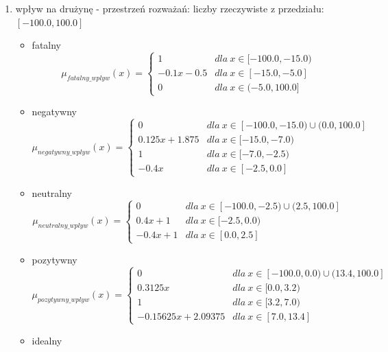 \documentclass{classrep}
\begin{document}
\begin{enumerate}
    \item wpływ na drużynę - przestrzeń rozważań: liczby rzeczywiste z przedziału:  $[-100.0, 100.0]$
    \begin{itemize}
        \item fatalny
        \begin{equation}
            \mu_{fatalny\_wplyw}(x) = \left\{\begin{matrix} 1 & dla \: x\in[-100.0, -15.0) \\ -0.1x - 0.5 & dla \: x\in [-15.0, -5.0] \\ 0 & dla \: x\in (-5.0, 100.0] \end{matrix}\right.
        \end{equation}
         \item negatywny
        \begin{equation}
            \mu_{negatywny\_wplyw}(x) = \left\{\begin{matrix} 0 & dla \: x\in [-100.0, -15.0) \cup (0.0, 100.0] \\ 0.125x + 1.875 & dla \: x\in[-15.0, -7.0) \\ 1 & dla \: x\in [-7.0, -2.5) \\ -0.4x & dla \: x\in [-2.5, 0.0]  \end{matrix}\right.
        \end{equation}
        \item neutralny
        \begin{equation}
            \mu_{neutralny\_wplyw}(x) = \left\{\begin{matrix} 0 & dla \: x\in [-100.0, -2.5) \cup (2.5, 100.0]  \\ 0.4x + 1 & dla \: x\in[-2.5, 0.0) \\ -0.4x + 1 & dla \: x\in [0.0, 2.5] \end{matrix}\right.
        \end{equation}
        \item pozytywny
        \begin{equation}
            \mu_{pozytywny\_wplyw}(x) = \left\{\begin{matrix} 0 & dla \: x\in [-100.0, 0.0) \cup (13.4, 100.0] \\ 0.3125x & dla \: x\in[0.0, 3.2) \\ 1 & dla \: x\in [3.2, 7.0) \\ -0.15625x + 2.09375 & dla \: x\in [7.0, 13.4]\end{matrix}\right.
        \end{equation}
        \item idealny

\end{itemize}
\end{enumerate}
\end{document}
